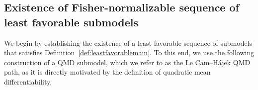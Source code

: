 \documentclass[11pt]{article}
\theoremstyle{plain}
\theoremstyle{definition}
\theoremstyle{remark}
\theoremstyle{definition}
\begin{document}
   

 

 




\subsection{Existence of Fisher-normalizable sequence of least favorable submodels}

\label{appendix:existenceleastfavorable}

We begin by establishing the existence of a least favorable sequence of submodels that satisfies Definition~\ref{def:leastfavorablemain}. To this end, we use the following construction of a QMD submodel, which we refer to as the Le Cam--Hájek QMD path, as it is directly motivated by the definition of quadratic mean differentiability.

 
\end{document}
